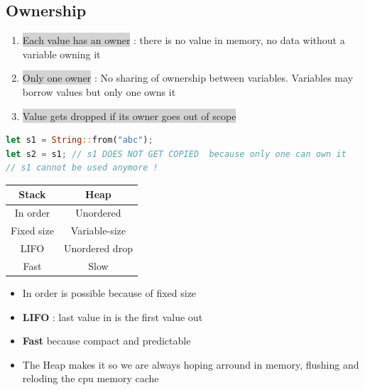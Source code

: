 \documentclass{report}
\begin{document}
\begin{multicols*}{2}

\section{Ownership}

\begin{enumerate}
  \item \colorbox{lightgray}{Each value has an owner} : there is no
        value in memory, no data without a variable owning it 
  \item \colorbox{lightgray}{Only one owner} : No sharing of ownership
        between variables. Variables may borrow values but only one owns it
  \item \colorbox{lightgray}{Value gets dropped if its owner goes out of scope} 
\end{enumerate}

\begin{tcolorbox}[title=Ownership is action,colback=backcolour,size=small,left=4mm]
\begin{lstlisting}[language=rust]
let s1 = String::from("abc");
let s2 = s1; // s1 DOES NOT GET COPIED  because only one can own it
// s1 cannot be used anymore !
\end{lstlisting}
\end{tcolorbox}

\begin{center}
  
  \begin{tabular}{c|c}
    \textbf{Stack} & \textbf{Heap} \\
    \hline
    In order & Unordered\\
    Fixed size & Variable-size\\
    LIFO & Unordered drop\\
    Fast & Slow\\
  \end{tabular}
\end{center}

\begin{itemize}
  \item In order is possible because of fixed size 
  \item \textbf{LIFO} : last value in is the first value out 
  \item \textbf{Fast} because compact and predictable 
  \item The Heap makes it so we are always hoping arround in memory, flushing
    and reloding the cpu memory cache
\end{itemize}


\end{multicols*}
\end{document}

